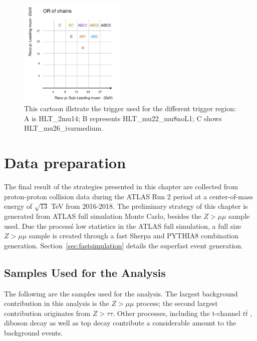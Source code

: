 \begin{figure}[!htb]
    \begin{center}
        \includegraphics[width=0.45\textwidth]{figures/chapter_dimuon/TriggerChain}        
        \caption{
        This cartoon illstrate the trigger used for the different trigger region: A is HLT\_2mu14; B represents HLT\_mu22\_mu8noL1; C shows HLT\_mu26\_ivarmedium. }
    \end{center}
\end{figure}
\FloatBarrier

\section{Data preparation}
The final result of the strategies presented in this chapter are collected from proton-proton collision data during the ATLAS Run 2 period at a center-of-mass energy of $\sqrt{13}$ TeV from 2016-2018. The preliminary strategy of this chapter is generated from ATLAS full simulation Monte Carlo, besides the $Z > \mu \mu $ sample used. Due the process\'s low statistics in the ATLAS full simulation, a full size $Z > \mu \mu$ sample is created through a fast Sherpa and PYTHIA8 combination
generation. Section~\ref{sec:fastsimulation} details the superfast event generation.

\subsection{Samples Used for the Analysis}
The following are the samples used for the analysis. The largest background contribution in this analysis is the $Z > \mu\mu $ process; the second largest contribution originates from $Z > \tau \tau$. Other processes, including the t-channel $t\bar{t}$ , diboson decay as well as top decay contribute a considerable amount to the background events.

